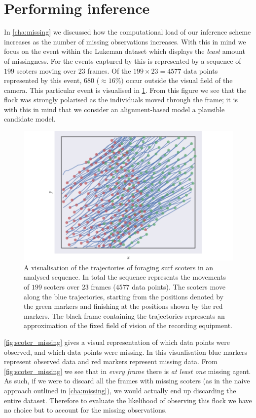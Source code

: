 \section{Performing inference}

In \cref{cha:missing} we discussed how the computational load of our inference
scheme increases as the number of missing observations increases. With this in
mind we focus on the event within the Lukeman dataset which displays the
\emph{least} amount of missingness. For the events captured by
\textcite{lukeman10} this is represented by a sequence of $199$ scoters moving
over $23$ frames. Of the $199\times23=4577$ data points represented by this
event, $680$ ($\approx16\%)$ occur outside the visual field of the camera.
This particular event is visualised in \cref{fig:scoter_traj}. From this figure
we see that the flock was strongly polarised as the individuals moved through
the frame; it is with this in mind that we consider an alignment-based model a
plausible candidate model.

\begin{figure}[tb]
  \includegraphics{data_00_traj.pdf}
  \caption{A visualisation of the trajectories of foraging surf scoters in an
    analysed sequence. In total the sequence represents the movements of
    $199$ scoters over $23$ frames ($4577$ data points). The scoters move
    along the blue trajectories, starting from the positions denoted by the
    green markers and finishing at the positions shown by the red markers. The
    black frame containing the trajectories represents an approximation of the
    fixed field of vision of the recording equipment.}
  \label{fig:scoter_traj}
\end{figure}

\cref{fig:scoter_missing} gives a visual representation of which data points
were observed, and which data points were missing. In this visualisation blue
markers represent observed data and red markers represent missing data. From
\cref{fig:scoter_missing} we see that in \emph{every frame} there is \emph{at
least one} missing agent. As such, if we were to discard all the frames with
missing scoters (as in the naive approach outlined in \cref{cha:missing}), we
would actually end up discarding the entire dataset. Therefore to evaluate the
likelihood of observing this flock we have no choice but to account for the
missing observations.

